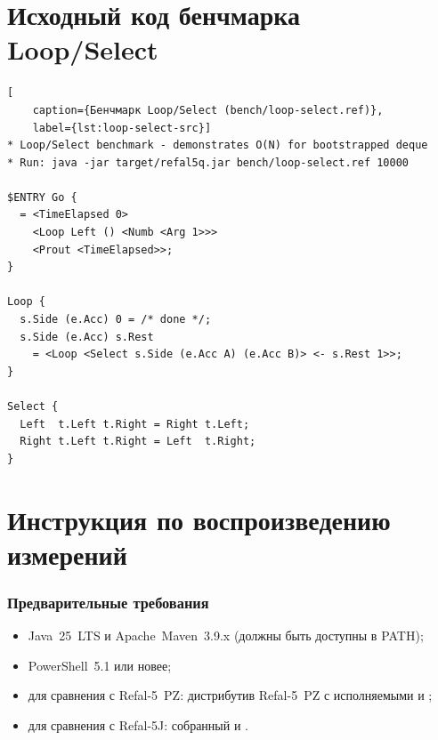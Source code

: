 \clearpage
\appendix
\renewcommand{\thesection}{\Asbuk{section}}
\setcounter{section}{0}

\section{Исходный код бенчмарка Loop/Select}
\label{app:bench-src}

\lstset{language=Refal}
\begin{lstlisting}[
    caption={Бенчмарк Loop/Select (bench/loop-select.ref)},
    label={lst:loop-select-src}]
* Loop/Select benchmark - demonstrates O(N) for bootstrapped deque
* Run: java -jar target/refal5q.jar bench/loop-select.ref 10000

$ENTRY Go {
  = <TimeElapsed 0>
    <Loop Left () <Numb <Arg 1>>>
    <Prout <TimeElapsed>>;
}

Loop {
  s.Side (e.Acc) 0 = /* done */;
  s.Side (e.Acc) s.Rest
    = <Loop <Select s.Side (e.Acc A) (e.Acc B)> <- s.Rest 1>>;
}

Select {
  Left  t.Left t.Right = Right t.Left;
  Right t.Left t.Right = Left  t.Right;
}
\end{lstlisting}

\section{Инструкция по воспроизведению измерений}
\label{app:repro}

\subsubsection*{Предварительные требования}

\begin{itemize}
  \item Java~25~LTS и Apache~Maven~3.9.x (должны быть доступны в PATH);
  \item PowerShell~5.1 или новее;
  \item для сравнения с Refal-5~PZ: дистрибутив Refal-5~PZ с исполняемыми
         и ;
  \item для сравнения с Refal-5J: собранный  и .
\end{itemize}

